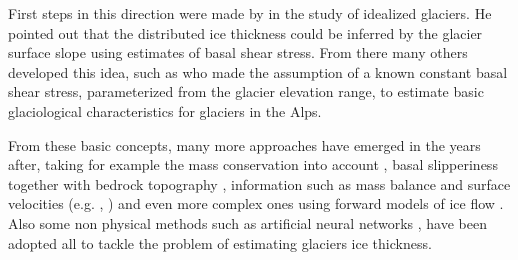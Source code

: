First steps in this direction were made by \citet{Nye1965} in the study of  idealized glaciers. He pointed out that the distributed ice thickness could be inferred by the glacier surface slope using estimates of basal shear stress. From there many others developed this idea, such as \citet{haeberli1995} who made the assumption of a known constant basal shear stress, parameterized from the glacier elevation range, to estimate basic glaciological characteristics for glaciers in the Alps. 

From these basic concepts, many more approaches have emerged in the years after, taking for example the mass conservation into account \citet{rasmussen_1988}, basal slipperiness together with bedrock topography \citet{Gudmundsson2001}, information such as mass balance and surface velocities (e.g. \citealt{gantayat2014}, \citealt{brinkerhoff2016}) and even more complex ones using forward models of ice flow \citet{vanPelt2013}. Also some non physical methods such as artificial neural networks \citet{Clarke2009}, have been adopted all to tackle the problem of estimating glaciers ice thickness. 

